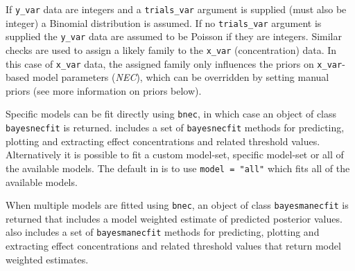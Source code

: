 \documentclass[
]{jss}
\begin{document}
If \texttt{y\_var} data are integers and a \texttt{trials\_var} argument
is supplied (must also be integer) a Binomial distribution is assumed.
If no \texttt{trials\_var} argument is supplied the \texttt{y\_var} data
are assumed to be Poisson if they are integers. Similar checks are used
to assign a likely family to the \texttt{x\_var} (concentration) data.
In this case of \texttt{x\_var} data, the assigned family only
influences the priors on \texttt{x\_var}-based model parameters
(\emph{NEC}), which can be overridden by setting manual priors (see more
information on priors below).

Specific models can be fit directly using \texttt{bnec}, in which case
an object of class \texttt{bayesnecfit} is returned. 
includes a set of \texttt{bayesnecfit} methods for predicting, plotting
and extracting effect concentrations and related threshold values.
Alternatively it is possible to fit a custom model-set, specific
model-set or all of the available models. The default in 
is to use \texttt{model\ =\ "all"} which fits all of the available
models.

When multiple models are fitted using \texttt{bnec}, an object of class
\texttt{bayesmanecfit} is returned that includes a model weighted
estimate of predicted posterior values.  also includes a
set of \texttt{bayesmanecfit} methods for predicting, plotting and
extracting effect concentrations and related threshold values that
return model weighted estimates.
\end{document}
